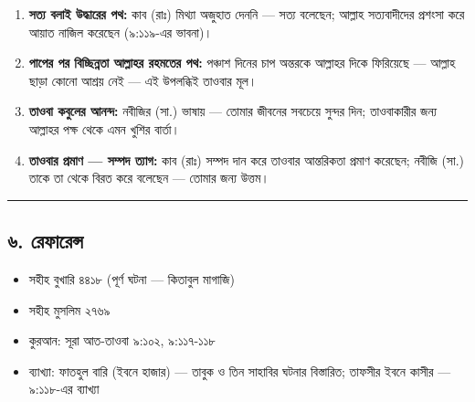 \begin{enumerate}
\item \textbf{সত্য বলাই উদ্ধারের পথ:} কাব (রাঃ) মিথ্যা অজুহাত দেননি — সত্য বলেছেন; আল্লাহ সত্যবাদীদের প্রশংসা করে আয়াত নাজিল করেছেন (৯:১১৯-এর ভাবনা)।
\item \textbf{পাপের পর বিচ্ছিন্নতা আল্লাহর রহমতের পথ:} পঞ্চাশ দিনের চাপ অন্তরকে আল্লাহর দিকে ফিরিয়েছে — আল্লাহ ছাড়া কোনো আশ্রয় নেই — এই উপলব্ধিই তাওবার মূল।
\item \textbf{তাওবা কবুলের আনন্দ:} নবীজির (সা.) ভাষায় — তোমার জীবনের সবচেয়ে সুন্দর দিন; তাওবাকারীর জন্য আল্লাহর পক্ষ থেকে এমন খুশির বার্তা।
\item \textbf{তাওবার প্রমাণ — সম্পদ ত্যাগ:} কাব (রাঃ) সম্পদ দান করে তাওবার আন্তরিকতা প্রমাণ করেছেন; নবীজি (সা.) তাকে তা থেকে বিরত করে বলেছেন — তোমার জন্য উত্তম।
\end{enumerate}
\medskip\hrule\medskip

\subsection*{৬. রেফারেন্স}

\begin{itemize}
\item সহীহ বুখারি ৪৪১৮ (পূর্ণ ঘটনা — কিতাবুল মাগাজি)
\item সহীহ মুসলিম ২৭৬৯
\item কুরআন: সূরা আত-তাওবা ৯:১০২, ৯:১১৭-১১৮
\item ব্যাখ্যা: ফাতহুল বারি (ইবনে হাজার) — তাবুক ও তিন সাহাবির ঘটনার বিস্তারিত; তাফসীর ইবনে কাসীর — ৯:১১৮-এর ব্যাখ্যা
\end{itemize}


